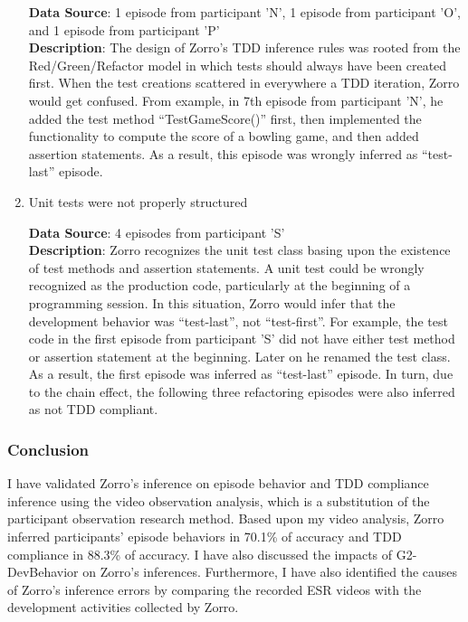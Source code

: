 \begin{enumerate}
\textbf{Data Source}: 1 episode from participant 'N', 1 episode
from participant 'O', and 1 episode from participant 'P' \\ 
\textbf{Description}: The design of Zorro's TDD inference rules was
rooted from the Red/Green/Refactor model in which tests should always 
have been created first. When the test creations scattered in everywhere
a TDD iteration, Zorro would get confused.  From example, in 7th episode
from participant 'N', he added the test method ``TestGameScore()'' first, 
then implemented the functionality to compute the score of a bowling 
game, and then added assertion statements. As a result, this episode
was wrongly inferred as ``test-last'' episode. 

\item Unit tests were not properly structured

\textbf{Data Source}: 4 episodes from participant 'S' \\ 
\textbf{Description}: Zorro recognizes the unit test class basing 
upon the existence of test methods and assertion statements. 
A unit test could be wrongly recognized as the production code, 
particularly at the beginning of a programming session. In 
this situation, Zorro would infer that the development behavior
was ``test-last'', not ``test-first''. For example, the test code 
in the first episode from participant 'S' did not have either 
test method or assertion statement at the beginning. Later on he 
renamed the test class. As a result, the first episode was inferred 
as ``test-last'' episode. In turn, due to the chain effect, the 
following three refactoring episodes were also inferred as not 
TDD compliant.

\end{enumerate}

\subsubsection{Conclusion}
I have validated Zorro's inference on episode behavior and TDD
compliance inference using the video observation analysis, which is a
substitution of the participant observation research method. Based
upon my video analysis, Zorro inferred participants' episode behaviors
in 70.1\% of accuracy and TDD compliance in 88.3\% of accuracy. I have
also discussed the impacts of G2-DevBehavior on Zorro's inferences.
Furthermore, I have also identified the causes of Zorro's inference
errors by comparing the recorded ESR videos with the development
activities collected by Zorro.

